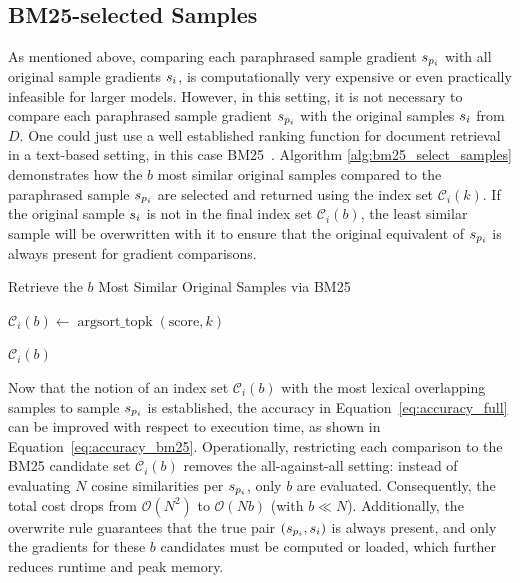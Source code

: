 \subsection{BM25-selected Samples}\label{subsec:bm25_selection}
As mentioned above, comparing each paraphrased sample gradient $s_{p_i}$ with all original sample gradients $s_i$, is computationally very expensive or even practically infeasible for larger models. However, in this setting, it is not necessary to compare each paraphrased sample gradient $s_{p_i}$ with the original samples $s_i$ from $D$. One could just use a well established ranking function for document retrieval in a text-based setting, in this case BM25~\cite{bm25}. 
Algorithm \ref{alg:bm25_select_samples} demonstrates how the $b$ most similar original samples compared to the paraphrased sample $s_{p_i}$ are selected and returned using the index set $\mathcal{C}_i(k)$. If the original sample $s_i$ is not in the final index set $\mathcal{C}_i(b)$, the least similar sample will be overwritten with it to ensure that the original equivalent of $s_{p_i}$ is always present for gradient comparisons.
\begin{algorithm}[ht]
\caption{Retrieve the $b$ Most Similar Original Samples via BM25}
\label{alg:bm25_select_samples}


\DontPrintSemicolon
{}
$\mathcal{C}_i(b) \gets \operatorname{argsort\_topk}(\text{score}, k)$\; 


\Return $\mathcal{C}_i(b)$
\end{algorithm}
Now that the notion of an index set $\mathcal{C}_i(b)$ with the most lexical overlapping samples to sample $s_{p_i}$ is established, the accuracy in Equation~\ref{eq:accuracy_full} can be improved with respect to execution time, as shown in Equation~\ref{eq:accuracy_bm25}. Operationally, restricting each comparison to the BM25 candidate set $\mathcal{C}_i(b)$ removes the all-against-all setting: instead of evaluating $N$ cosine similarities per $s_{p_i}$, only $b$ are evaluated. Consequently, the total cost drops from $\mathcal{O}(N^2)$ to $\mathcal{O}(Nb)$ (with $b \ll N$). Additionally, the overwrite rule guarantees that the true pair $(s_{p_i},s_i)$ is always present, and only the gradients for these $b$ candidates must be computed or loaded, which further reduces runtime and peak memory.
